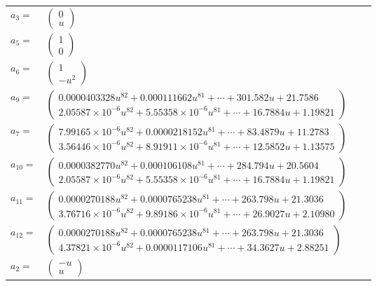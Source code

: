 \documentclass[1p]{elsarticle_modified}
\theoremstyle{definition}
\begin{document}
\begin{tabular}{m{7pt} m{180pt} m{7pt} m{180pt} }
\flushright $a_{3}=$&$\begin{pmatrix}0\\u\end{pmatrix}$ \\
\flushright $a_{5}=$&$\begin{pmatrix}1\\0\end{pmatrix}$ \\
\flushright $a_{6}=$&$\begin{pmatrix}1\\- u^2\end{pmatrix}$ \\
\flushright $a_{9}=$&$\begin{pmatrix}0.0000403328 u^{82}+0.000111662 u^{81}+\cdots+301.582 u+21.7586\\2.05587\times10^{-6} u^{82}+5.55358\times10^{-6} u^{81}+\cdots+16.7884 u+1.19821\end{pmatrix}$ \\
\flushright $a_{7}=$&$\begin{pmatrix}7.99165\times10^{-6} u^{82}+0.0000218152 u^{81}+\cdots+83.4879 u+11.2783\\3.56446\times10^{-6} u^{82}+8.91911\times10^{-6} u^{81}+\cdots+12.5852 u+1.13575\end{pmatrix}$ \\
\flushright $a_{10}=$&$\begin{pmatrix}0.0000382770 u^{82}+0.000106108 u^{81}+\cdots+284.794 u+20.5604\\2.05587\times10^{-6} u^{82}+5.55358\times10^{-6} u^{81}+\cdots+16.7884 u+1.19821\end{pmatrix}$ \\
\flushright $a_{11}=$&$\begin{pmatrix}0.0000270188 u^{82}+0.0000765238 u^{81}+\cdots+263.798 u+21.3036\\3.76716\times10^{-6} u^{82}+9.89186\times10^{-6} u^{81}+\cdots+26.9027 u+2.10980\end{pmatrix}$ \\
\flushright $a_{12}=$&$\begin{pmatrix}0.0000270188 u^{82}+0.0000765238 u^{81}+\cdots+263.798 u+21.3036\\4.37821\times10^{-6} u^{82}+0.0000117106 u^{81}+\cdots+34.3627 u+2.88251\end{pmatrix}$ \\
\flushright $a_{2}=$&$\begin{pmatrix}- u\\u\end{pmatrix}$ \\

\end{tabular}
\end{document}
